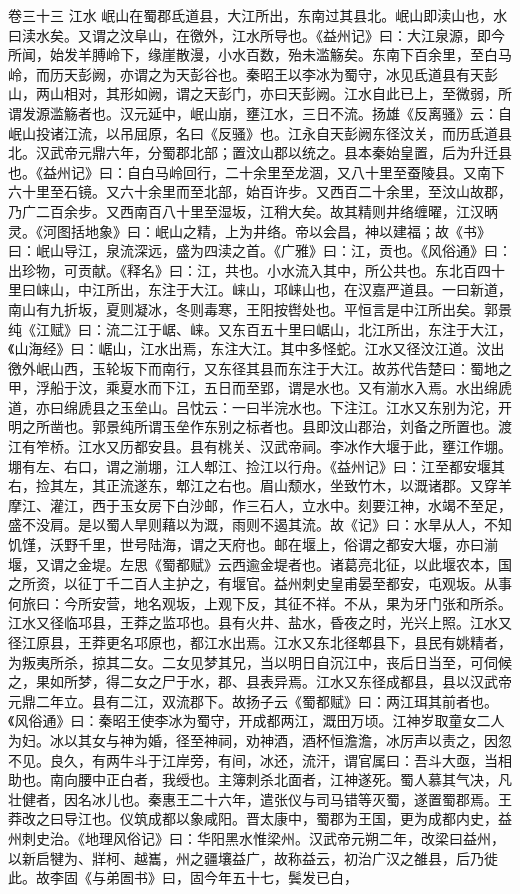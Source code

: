 \documentclass[12pt,UTF8]{ctexbook}
\begin{document}
卷三十三  江水 
岷山在蜀郡氐道县，大江所出，东南过其县北。岷山即渎山也，水曰渎水矣。又谓之汶阜山，在徼外，江水所导也。《益州记》曰：大江泉源，即今所闻，始发羊膊岭下，缘崖散漫，小水百数，殆未滥觞矣。东南下百余里，至白马岭，而历天彭阙，亦谓之为天彭谷也。秦昭王以李冰为蜀守，冰见氐道县有天彭山，两山相对，其形如阙，谓之天彭门，亦曰天彭阙。江水自此已上，至微弱，所谓发源滥觞者也。汉元延中，岷山崩，壅江水，三日不流。扬雄《反离骚》云：自岷山投诸江流，以吊屈原，名曰《反骚》也。江永自天彭阙东径汶关，而历氐道县北。汉武帝元鼎六年，分蜀郡北部；置汶山郡以统之。县本秦始皇置，后为升迁县也。《益州记》曰：自白马岭回行，二十余里至龙涸，又八十里至蚕陵县。又南下六十里至石镜。又六十余里而至北部，始百许步。又西百二十余里，至汶山故郡，乃广二百余步。又西南百八十里至湿坂，江稍大矣。故其精则井络缠曜，江汉昞灵。《河图括地象》曰：岷山之精，上为井络。帝以会昌，神以建福；故《书》曰：岷山导江，泉流深远，盛为四渎之首。《广雅》曰：江，贡也。《风俗通》曰：出珍物，可贡献。《释名》曰：江，共也。小水流入其中，所公共也。东北百四十里曰崃山，中江所出，东注于大江。崃山，邛崃山也，在汉嘉严道县。一曰新道，南山有九折坂，夏则凝冰，冬则毒寒，王阳按辔处也。平恒言是中江所出矣。郭景纯《江赋》曰：流二江于崌、崃。又东百五十里曰崌山，北江所出，东注于大江，《山海经》曰：崌山，江水出焉，东注大江。其中多怪蛇。江水又径汶江道。汶出徼外岷山西，玉轮坂下而南行，又东径其县而东注于大江。故苏代告楚曰：蜀地之甲，浮船于汶，乘夏水而下江，五日而至郢，谓是水也。又有湔水入焉。水出绵虒道，亦曰绵虒县之玉垒山。吕忱云：一曰半浣水也。下注江。江水又东别为沱，开明之所凿也。郭景纯所谓玉垒作东别之标者也。县即汶山郡治，刘备之所置也。渡江有笮桥。江水又历都安县。县有桃关、汉武帝祠。李冰作大堰于此，壅江作堋。堋有左、右口，谓之湔堋，江人郫江、捡江以行舟。《益州记》曰：江至都安堰其右，捡其左，其正流遂东，郫江之右也。眉山颓水，坐致竹木，以溉诸郡。又穿羊摩江、灌江，西于玉女房下白沙邮，作三石人，立水中。刻要江神，水竭不至足，盛不没肩。是以蜀人旱则藉以为溉，雨则不遏其流。故《记》曰：水旱从人，不知饥馑，沃野千里，世号陆海，谓之天府也。邮在堰上，俗谓之都安大堰，亦曰湔堰，又谓之金堤。左思《蜀都赋》云西逾金堤者也。诸葛亮北征，以此堰农本，国之所资，以征丁千二百人主护之，有堰官。益州刺史皇甫晏至都安，屯观坂。从事何旅曰：今所安营，地名观坂，上观下反，其征不祥。不从，果为牙门张和所杀。江水又径临邛县，王莽之监邛也。县有火井、盐水，昏夜之时，光兴上照。江水又径江原县，王莽更名邛原也，都江水出焉。江水又东北径郫县下，县民有姚精者，为叛夷所杀，掠其二女。二女见梦其兄，当以明日自沉江中，丧后日当至，可伺候之，果如所梦，得二女之尸于水，郡、县表异焉。江水又东径成都县，县以汉武帝元鼎二年立。县有二江，双流郡下。故扬子云《蜀都赋》曰：两江珥其前者也。《风俗通》曰：秦昭王使李冰为蜀守，开成都两江，溉田万顷。江神岁取童女二人为妇。冰以其女与神为婚，径至神祠，劝神酒，酒杯恒澹澹，冰厉声以责之，因忽不见。良久，有两牛斗于江岸旁，有间，冰还，流汗，谓官属曰：吾斗大亟，当相助也。南向腰中正白者，我绶也。主簿刺杀北面者，江神遂死。蜀人慕其气决，凡壮健者，因名冰儿也。秦惠王二十六年，遣张仪与司马错等灭蜀，遂置蜀郡焉。王莽改之曰导江也。仪筑成都以象咸阳。晋太康中，蜀郡为王国，更为成都内史，益州刺史治。《地理风俗记》曰：华阳黑水惟梁州。汉武帝元朔二年，改梁曰益州，以新启犍为、牂柯、越巂，州之疆壤益广，故称益云，初治广汉之雒县，后乃徙此。故李固《与弟圄书》曰，固今年五十七，鬓发已白，
\end{document}
